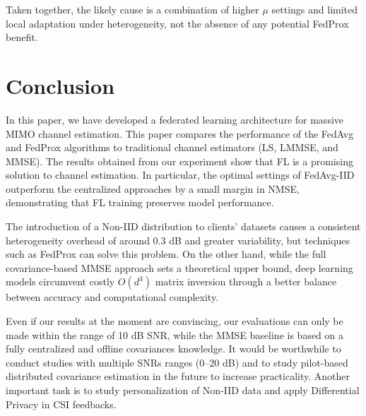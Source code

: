 \documentclass[runningheads]{llncs}
\begin{document}
Taken together, the likely cause is a combination of higher $\mu$ settings and limited local adaptation under heterogeneity, not the absence of any potential FedProx benefit.



\section{Conclusion}
In this paper, we have developed a federated learning architecture for massive MIMO channel estimation. This paper compares the performance of the FedAvg and FedProx algorithms to traditional channel estimators (LS, LMMSE, and MMSE). The results obtained from our experiment show that FL is a promising solution to channel estimation. In particular, the optimal settings of FedAvg-IID outperform the centralized approaches by a small margin in NMSE, demonstrating that FL training preserves model performance.


The introduction of a Non-IID distribution to clients' datasets causes a consistent heterogeneity overhead of around 0.3 dB and greater variability, but techniques such as FedProx can solve this problem. On the other hand, while
the full covariance-based MMSE approach sets a theoretical upper bound, deep learning models circumvent costly $O(d^3)$ matrix inversion through a better balance between accuracy and computational complexity.


Even if our results at the moment are convincing, our evaluations can only be made within the range of 10 dB SNR, while the MMSE baseline is based on a fully centralized and offline covariances knowledge. It would be worthwhile to conduct studies with multiple SNRs ranges (0–20 dB) and to study pilot-based distributed covariance estimation in the future to increase practicality. Another important task is to study personalization of Non-IID data and apply Differential Privacy in CSI feedbacks.



\end{document}
